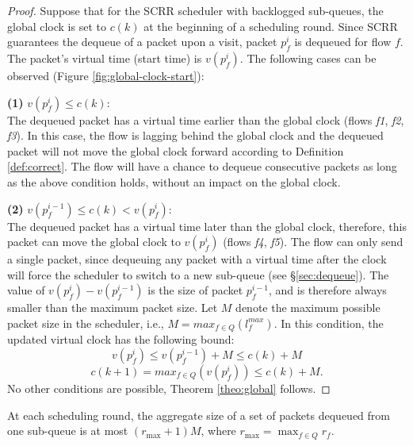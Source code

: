 \begin{proof}
Suppose that for the SCRR scheduler with backlogged sub-queues, the global clock is set to $c(k)$ at the beginning of a scheduling round. Since SCRR guarantees the dequeue of a packet upon a visit, packet $p_f^i$ is dequeued for flow $f$. The packet's virtual time (start time) is $v(p_f^i)$. The following cases can be observed  (Figure \ref{fig:global-clock-start}):

    \textbf{(1)} $v(p_f^i) \leq c(k)$:
    \\ 
    The dequeued packet has a virtual time earlier than the global clock (flows \textit{f1}, \textit{f2}, \textit{f3}). In this case, the flow is lagging behind the global clock and the dequeued packet will not move the global clock forward according to Definition \ref{def:correct}. The flow will have a chance to dequeue consecutive packets as long as the above condition holds, without an impact on the global clock. 
    
    \textbf{(2)} $v(p_f^{i-1}) \leq c(k) < v(p_f^i)$:
    \\ 
    The dequeued packet has a virtual time later than the global clock, therefore, this packet can move the global clock to $v(p_f^i)$ (flows \textit{f4}, \textit{f5}). The flow can only send a single packet, since dequeuing any packet with a virtual time after the clock will force the scheduler to switch to a new sub-queue (see \S\ref{sec:dequeue}). The value of $v(p_f^i) - v(p_f^{i-1})$ is the size of packet $p_f^{i-1}$, and is therefore always smaller than the maximum packet size. Let $M$ denote the maximum possible packet size in the scheduler, i.e., $M = max_{f \in Q}(l^{max}_f)$. In this condition, the updated virtual clock has the following bound:
    $$v(p_f^i) \leq v(p_f^{i-1}) + M \leq c(k) + M$$
    $$c(k+1) = max_{f \in Q}(v(p_f^i)) \leq c(k) + M.$$
No other conditions are possible, Theorem \ref{theo:global} follows.\qedhere
\end{proof}

\begin{theorem}
\label{theo:burst}
At each scheduling round, the aggregate size of a set of packets dequeued from one sub-queue is at most $\left( r_{\max} + 1 \right) M$, where $r_{\max} = \max_{f \in Q} r_f$.
\end{theorem}


